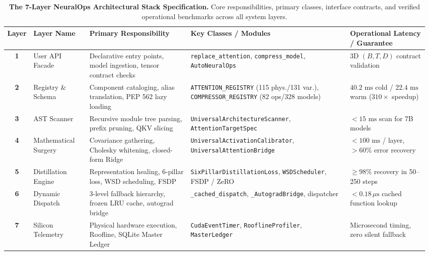 \begin{table}[t]
\centering
\small
\caption[The 7-Layer NeuralOps Architectural Stack Specification]{\textbf{The 7-Layer NeuralOps Architectural Stack Specification.} Core responsibilities, primary classes, interface contracts, and verified operational benchmarks across all system layers.}
\label{tab:7layer_stack}
\label{tab:7layer_master_specs}
\setlength{\tabcolsep}{3.5pt}
\renewcommand{\arraystretch}{1.2}
\begin{tabularx}{\textwidth}{@{} c l X X p{3.6cm} @{}}
\toprule
\textbf{Layer} & \textbf{Layer Name} & \textbf{Primary Responsibility} & \textbf{Key Classes / Modules} & \textbf{Operational Latency / Guarantee} \\
\midrule
\textbf{1} & User API Facade & Declarative entry points, model ingestion, tensor contract checks & \texttt{replace\_attention}, \texttt{compress\_model}, \texttt{AutoNeuralOps} & 3D $(B, T, D)$ contract validation \\
\textbf{2} & Registry \& Schema & Component cataloging, alias translation, PEP 562 lazy loading & \texttt{ATTENTION\_REGISTRY} (115 phys./131 var.), \texttt{COMPRESSOR\_REGISTRY} (82 ops/328 models) & $40.2\text{ ms}$ cold / $22.4\text{ ms}$ warm ($310\times$ speedup) \\
\textbf{3} & AST Scanner & Recursive module tree parsing, prefix pruning, QKV slicing & \texttt{UniversalArchitecture\-Scanner}, \texttt{AttentionTargetSpec} & $<15\text{ ms}$ scan for 7B models \\
\textbf{4} & Mathematical Surgery & Covariance gathering, Cholesky whitening, closed-form Ridge & \texttt{UniversalActivation\-Calibrator}, \texttt{UniversalAttention\-Bridge} & $<100\text{ ms}$ / layer, $>60\%$ error recovery \\
\textbf{5} & Distillation Engine & Representation healing, 6-pillar loss, WSD scheduling, FSDP & \texttt{SixPillarDistillation\-Loss}, \texttt{WSDScheduler}, FSDP / ZeRO & $\ge 98\%$ recovery in 50--250 steps \\
\textbf{6} & Dynamic Dispatch & 3-level fallback hierarchy, frozen LRU cache, autograd bridge & \texttt{\_cached\_dispatch}, \texttt{\_AutogradBridge}, dispatcher & $<0.18\,\mu\text{s}$ cached function lookup \\
\textbf{7} & Silicon Telemetry & Physical hardware execution, Roofline, SQLite Master Ledger & \texttt{CudaEventTimer}, \texttt{RooflineProfiler}, \texttt{MasterLedger} & Microsecond timing, zero silent fallback \\
\bottomrule
\end{tabularx}
\end{table}

